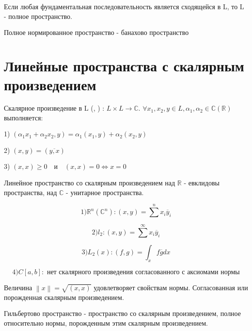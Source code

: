 \documentclass[12pt, a4paper]{report}
\begin{document}
\begin{definition}
    Если любая фундаментальная последовательность является сходящейся в L, то L - полное пространство.
\end{definition}

\begin{definition}
    Полное нормированное пространство - банахово пространство
\end{definition}

\section{Линейные пространства с скалярным произведением}

\begin{definition}
    Скалярное произведение в L (, ) : \( L \times L \to  \mathbb{C} \). \( \forall x_1,x_2, y \in  L, \alpha_1,\alpha_2 \in \mathbb{C}(\mathbb{R}) \) выполняется: 

    1) \( (\alpha_1 x_1 + \alpha_2 x_2, y ) = \alpha_1(x_1,y )+ \alpha_2 (x_2,y) \) 

    2) \( (x,y ) = (\overline{y,x} )\)  

    3) \( (x,x ) \ge  0 \quad \text{и}  \quad  (x,x ) = 0 \Leftrightarrow x =0\) 
\end{definition}

Линейное пространство со скалярным произведением над \( \mathbb{R}   \) - евклидовы пространства, над \( \mathbb{C}    \) - унитарное пространства. 

\[ 1) \mathbb{R} ^ n ( \mathbb{C}^ n ): (x, y ) = \sum  ^{n }  x_i \overline{y } _i   \] 

\[ 2) l_2 : (x,y ) = \sum ^{\infty  } x_i \overline{y } _i   \] 

\[ 3) L_2(x ) : (f,g )= \int  _{x } f \overline{g } dx   \] 

\[ 4) C[a,b ] : \text{ нет скалярного произведения согласованного  с аксиомами нормы} \] 

\begin{lemma}
    Величина \( \left\lVert x  \right\rVert = \sqrt{(x,x)} \) удовлетворяет свойствам нормы. Согласованная или порожденная скалярным произведением.
\end{lemma}


\begin{definition}
    Гильбертово пространство - пространство со скалярным произведением, полное относительно нормы, порожденным этим скалярным произведением.
\end{definition}
\end{document}
